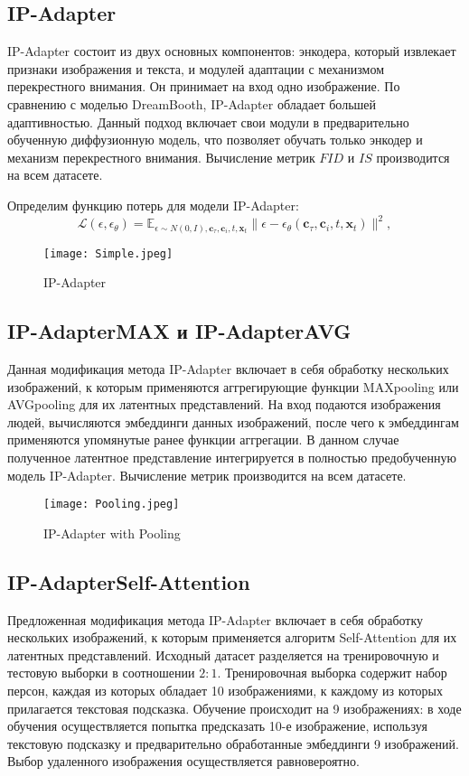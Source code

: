\documentclass{article}
\begin{document}
\subsection{IP-Adapter}
IP-Adapter состоит из двух основных компонентов: энкодера, который извлекает признаки изображения и текста, и модулей адаптации с механизмом перекрестного внимания. Он принимает на вход одно изображение. По сравнению с моделью DreamBooth, IP-Adapter обладает большей адаптивностью. Данный подход включает свои модули в предварительно обученную диффузионную модель, что позволяет обучать только энкодер и механизм перекрестного внимания. Вычисление метрик $FID$ и $IS$ производится на всем датасете. \par
Определим функцию потерь для модели IP-Adapter:
\begin{equation}
\mathcal{L}(\epsilon, \epsilon_{\theta}) = \mathbb{E}_{\epsilon \sim N(0, I),\mathbf{c}_{\tau}, \mathbf{c}_{i}, t, \mathbf{x}_{t}} \|\epsilon - \epsilon_{\theta}(\mathbf{c}_{\tau}, \mathbf{c}_{i} , t, \mathbf{x}_{t})\|^2,
\end{equation}

\begin{figure}[H]
    \centering
    \texttt{[image: Simple.jpeg]}
    \caption{IP-Adapter}
    \label{fig:simple}
\end{figure}


\subsection{IP-AdapterMAX и IP-AdapterAVG}
Данная модификация метода IP-Adapter включает в себя обработку нескольких изображений, к которым применяются аггрегирующие функции MAXpooling или AVGpooling для их латентных представлений. На вход подаются изображения людей, вычисляются эмбеддинги данных изображений, после чего к эмбеддингам применяются упомянутые ранее функции аггрегации. В данном случае полученное латентное представление интегрируется в полностью предобученную модель IP-Adapter. Вычисление метрик производится на всем датасете.

\begin{figure}[H]
    \centering
    \texttt{[image: Pooling.jpeg]}
    \caption{IP-Adapter with Pooling}
    \label{fig:pooling}
\end{figure}


\subsection{IP-AdapterSelf-Attention}
Предложенная модификация метода IP-Adapter включает в себя обработку нескольких изображений, к которым применяется алгоритм Self-Attention\cite{4} для их латентных представлений. Исходный датасет разделяется на тренировочную и тестовую выборки в соотношении $2:1$. Тренировочная выборка содержит набор персон, каждая из которых обладает 10 изображениями, к каждому из которых прилагается текстовая подсказка. Обучение происходит на 9 изображениях: в ходе обучения осуществляется попытка предсказать 10-е изображение, используя текстовую подсказку и предварительно обработанные эмбеддинги 9 изображений. Выбор удаленного изображения осуществляется равновероятно.
\end{document}
